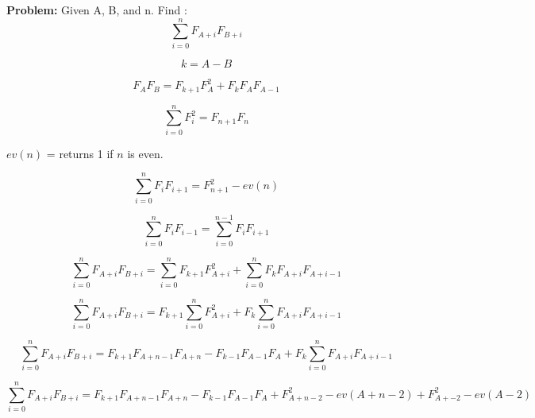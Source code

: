 \documentclass{article}
\begin{document}
  \textbf{Problem:} Given A, B, and n. Find :
  $$
    \sum_{i = 0}^{n} F_{A + i} F_{B + i}
  $$

  \begin{equation}
    k = A - B
  \end{equation}


  \begin{equation}
    F_{A} F_{B} = F_{k + 1} F_{A} ^ 2 + F_{k} F_{A} F_{A - 1}
  \end{equation}

  \begin{equation}
    \sum_{i = 0}^{n} F_{i} ^ 2 = F_{n + 1} F_{n}
  \end{equation}

  $ev(n)$ = returns 1 if $n$ is even.

  \begin{equation}
    \sum_{i = 0}^{n} F_{i} F_{i + 1} = F_{n + 1} ^ {2} - ev(n)
  \end{equation}

  \begin{equation}
    \sum_{i = 0}^{n} F_{i} F_{i - 1} = \sum_{i = 0}^{n - 1} F_{i} F_{i + 1}
  \end{equation}


  \begin{equation}
    \sum_{i = 0}^{n} F_{A + i} F_{B + i} =  \sum_{i = 0}^{n} F_{k + 1} F_{A + i}^{2}
    +  \sum_{i = 0}^{n} F_{k} F_{A + i} F_{A + i - 1}
  \end{equation}

  \begin{equation}
    \sum_{i = 0}^{n} F_{A + i} F_{B + i} =  F_{k + 1} \sum_{i = 0}^{n} F_{A + i}^{2}
    +  F_{k} \sum_{i = 0}^{n} F_{A + i} F_{A + i - 1}
  \end{equation}

  \begin{equation}
    \sum_{i = 0}^{n} F_{A + i} F_{B + i} =  F_{k + 1} F_{A + n - 1} F_{A + n}
    - F_{k - 1} F_{A - 1} F_{A}
    +  F_{k} \sum_{i = 0}^{n} F_{A + i} F_{A + i - 1}
  \end{equation}

  \begin{equation}
    \sum_{i = 0}^{n} F_{A + i} F_{B + i} =  F_{k + 1} F_{A + n - 1} F_{A + n}
    - F_{k - 1} F_{A - 1} F_{A}
    + F_{A + n - 2} ^ {2} - ev(A + n - 2)
    + F_{A + - 2} ^ {2} - ev(A - 2)
  \end{equation}
\end{document}
